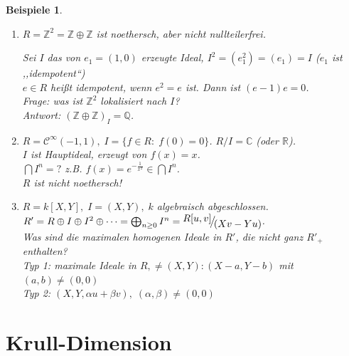 \documentclass[a4paper,12pt]{scrbook}
\theoremstyle{break}
\theoremstyle{nonumberbreak}
\newtheorem{nnBsp}{Beispiele}
\theoremstyle{nonumberplain}
\newcommand{\FakRaum}[2]{
  \raisebox{0.7ex}{\ensuremath{#1}}
  \ensuremath{\mkern-3mu}\big/\ensuremath{\mkern-3mu}
  \raisebox{-0.6ex}{\ensuremath{#2}}}
\begin{document}
\begin{nnBsp}
  \begin{enumerate}
    \item[1)] $R = \mathbb{Z}^2 = \mathbb{Z} \oplus \mathbb{Z}$ ist noethersch, aber nicht nullteilerfrei.

      Sei $I$ das von $e_1 = (1,0)$ erzeugte Ideal, $I^2 = (e_1^2)= (e_1) = I$ ($e_1$ ist ,,idempotent``)\\
      $e \in R$ heißt idempotent, wenn $e^2 = e$ ist. Dann ist $(e-1)e = 0$.\\
      Frage: was ist $\mathbb{Z}^2$ lokalisiert nach $I$?\\
      Antwort: $(\mathbb{Z} \oplus \mathbb{Z})_I = \mathbb{Q}$.

    \item[2)] $R = \mathcal{C}^{\infty}(-1,1), \; I = \{f \in R: \; f(0)=0\}$. $R/I = \mathbb{C}$ (oder $\mathbb{R}$).\\
      $I$ ist Hauptideal, erzeugt von $f(x) = x$.\\
      $\bigcap I^n = \text{?}$ z.B. $f(x) = e^{-\frac{1}{x^2}} \in \bigcap I^n$.\\
      $R$ ist nicht noethersch!

    \item[3)] $R = k[X,Y], \; I = (X,Y), \; k$ algebraisch abgeschlossen.\\
      $R' = R \oplus I \oplus I^2 \oplus \dots = \bigoplus_{n \geq 0} I^n = \FakRaum{R[u,v]}{(X v - Y u)}$.\\
      Was sind die maximalen homogenen Ideale in $R'$, die nicht ganz $R'_+$ enthalten?\\
      Typ 1: maximale Ideale in $R, \not= (X,Y): (X-a, Y-b)$ mit $(a,b) \not=(0,0)$\\
      Typ 2: $(X,Y, \alpha u + \beta v), \; (\alpha, \beta) \not= (0,0)$
  \end{enumerate}
\end{nnBsp}
\section{Krull-Dimension}
\end{document}
